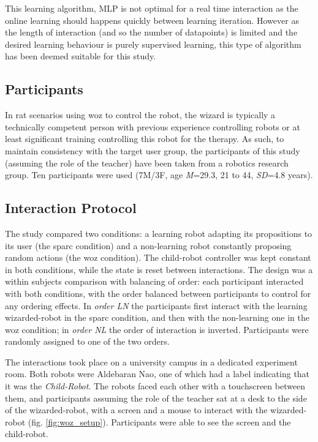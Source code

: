 This learning algorithm, MLP is not optimal for a real time interaction as the online learning should happens quickly between learning iteration. However as the length of interaction (and so the number of datapoints) is limited and the desired learning behaviour is purely supervised learning, this type of algorithm has been deemed suitable for this study.

\subsection{Participants}

In \gls{rat} scenarios using \gls{woz} to control the robot, the wizard is typically a technically competent person with previous experience controlling robots or at least significant training controlling this robot for the therapy. As such, to maintain consistency with the target user group, the participants of this study (assuming the role of the teacher) have been taken from a robotics research group. Ten participants were used (7M/3F, age \textit{M}=29.3, 21 to 44, \textit{SD}=4.8 years).

\subsection{Interaction Protocol}

The study compared two conditions: a learning robot adapting its propositions to its user (the \gls{sparc} condition) and a non-learning robot constantly proposing random actions (the \gls{woz} condition). The child-robot controller was kept constant in both conditions, while the state is reset between interactions. The design was a within subjects comparison with balancing of order: each participant interacted with both conditions, with the order balanced between participants to control for any ordering effects. In \textit{order LN} the participants first interact with the learning wizarded-robot in the \gls{sparc} condition, and then with the non-learning one in the \gls{woz} condition; in \textit{order NL} the order of interaction is inverted. Participants were randomly assigned to one of the two orders.

The interactions took place on a university campus in a dedicated experiment room. Both robots were Aldebaran Nao, one of which had a label indicating that it was the \emph{Child-Robot}. The robots faced each other with a touchscreen between them, and participants assuming the role of the teacher sat at a desk to the side of the wizarded-robot, with a screen and a mouse to interact with the wizarded-robot (fig. \ref{fig:woz_setup}). Participants were able to see the screen and the child-robot.

